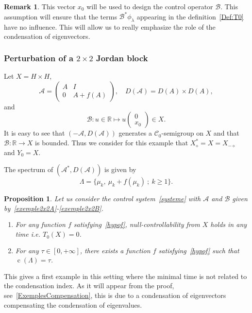 \documentclass[11pt]{article}
\newtheorem{prop}[theo]{Proposition}
\theoremstyle{definition}
\newtheorem{rema}[theo]{Remark}
\numberwithin{equation}{section}
\numberwithin{figure}{section}
\numberwithin{table}{section}
\newcommand\A{\mathcal{A}}
\newcommand\As{\mathcal{A}^*}
\newcommand\B{\mathcal{B}}
\newcommand{\DA}{D(\A)}
\newcommand{\Xalphas}{X_\diamond^*}
\newcommand{\Xmalpha}{X_{-\diamond}}
\newcommand{\Fzp}{Y_0}
\newcommand{\R}{\mathbb{R}}
\DeclareMathOperator{\cond}{c}
\newcommand*{\romanenumi}{\renewcommand*{\theenumi}{\roman{enumi}}}
\begin{document}
\begin{rema}
This vector $x_0$ will be used to design the control operator $\B$. This assumption will ensure that the terms $\B^* \phi_\lambda$ appearing in the definition~\eqref{Def:T0} have no influence. This will allow us to really emphasize the role of the condensation of eigenvectors.
\end{rema}

\subsubsection{Perturbation of a \texorpdfstring{$2 \times 2$}{2x2} Jordan block}\label{secexample2x2}

Let $X=H \times H$,
\begin{equation}\label{exemple2x2A}
\A=
\begin{pmatrix} A & I \\ 0 & A+f(A)
\end{pmatrix},
\quad
\DA=D(A)\times D(A),
\end{equation}
and
\begin{equation}\label{exemple2x2B}
\B : u \in \R \mapsto u
\begin{pmatrix} 0\\ x_0
\end{pmatrix} \in X.
\end{equation}
It is easy to see that $(-\A,\DA)$ generates a $\mathcal C_0$-semigroup on $X$ and that $\B:\R\to X$ is bounded. Thus we consider for this example that $\Xalphas = X = \Xmalpha$ and $\Fzp=X$.

The spectrum of $(\As, \DA)$ is given by
\[
\Lambda = \{ \mu_k, \: \mu_k+f(\mu_k) \: ; \: k \geq 1\}.
\]

\begin{prop}\label{Prop:Academique1}
Let us consider the control system~\eqref{systeme} with $\A$ and $\B$ given by~\eqref{exemple2x2A}-\eqref{exemple2x2B}.
\begin{enumerate}\romanenumi
\item \label{prop5.2.1} For any function $f$ satisfying~\eqref{hypof}, null-controllability from $X$ holds in any time i.e. $T_0(X)=0$.
\smallskip
\item \label{prop5.2.2}For any $\tau \in [0,+\infty]$, there exists a function $f$ satisfying~\eqref{hypof} such that $\cond(\Lambda)= \tau$.
\end{enumerate}
\end{prop}

This gives a first example in this setting where the minimal time is not related to the condensation index. As it will appear from the proof, see~\eqref{ExemplesCompensation}, this is due to a condensation of eigenvectors compensating the condensation of eigenvalues.
\end{document}
